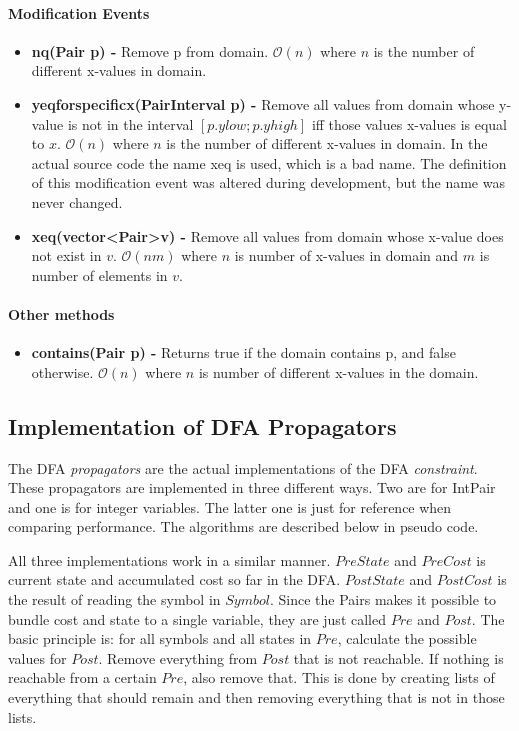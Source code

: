 \documentclass[a4paper,11pt]{article}
\begin{document}
\paragraph{Modification Events}
\begin{itemize}
\item {\textbf{nq(Pair p) - }} Remove p from domain. $\mathcal{O}(n)$ where $n$ is the number of different x-values in domain.

\item{\textbf{yeqforspecificx(PairInterval p) - }} Remove all values from domain whose y-value is not in the interval $[p.ylow; p.yhigh]$ iff those values x-values is equal to $x$. $\mathcal{O}(n)$ where $n$ is the number of different x-values in domain. In the actual source code the name xeq is used, which is a bad name. The definition of this modification event was altered during development, but the name was never changed.

\item{\textbf{xeq(vector\textless Pair\textgreater v) - }} Remove all values from domain whose x-value does not exist in $v$. $\mathcal{O}(nm)$ where $n$ is number of x-values in domain and $m$ is number of elements in $v$.
\end{itemize}

\paragraph{Other methods}
\begin{itemize}
\item {\textbf{contains(Pair p) - }} Returns true if the domain contains p, and false otherwise. $\mathcal{O}(n)$ where $n$ is number of different x-values in the domain.
\end{itemize}

\subsection{Implementation of DFA Propagators}
The DFA \textit{propagators} are the actual implementations of the DFA \textit{constraint}. These propagators are implemented in three different ways. Two are for IntPair and one is for integer variables. The latter one is just for reference when comparing performance. The algorithms are described below in pseudo code.

All three implementations work in a similar manner. $PreState$ and $PreCost$ is current state and accumulated cost so far in the DFA. $PostState$ and $PostCost$ is the result of reading the symbol in $Symbol$. Since the Pairs makes it possible to bundle cost and state to a single variable, they are just called $Pre$ and $Post$. The basic principle is: for all symbols and all states in $Pre$, calculate the possible values for $Post$. Remove everything from $Post$ that is not reachable. If nothing is reachable from a certain $Pre$, also remove that. This is done by creating lists of everything that should remain and then removing everything that is not in those lists.
\end{document}
